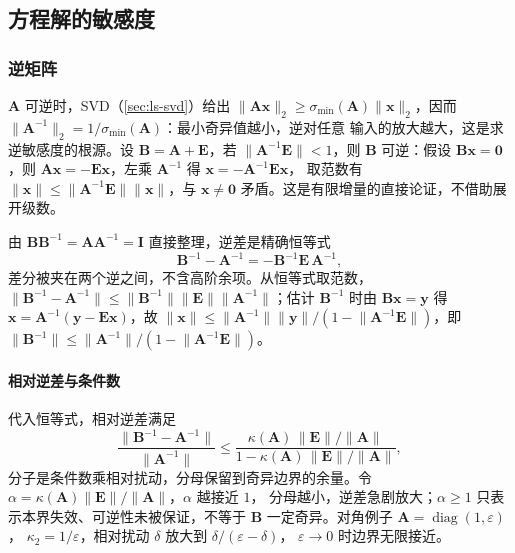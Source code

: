 \subsection{方程解的敏感度}
\label{sec:ls-equation-sensitivity}

\subsubsection{逆矩阵}
\label{sec:ls-inverse-sensitivity}
\label{sec:ch06-inverse-stability}

$\bm A$ 可逆时，SVD（\ref{sec:ls-svd}）给出 $\lVert\bm A\bm x\rVert_2
\geq\sigma_{\min}(\bm A)\lVert\bm x\rVert_2$，因而
$\lVert\bm A^{-1}\rVert_2=1/\sigma_{\min}(\bm A)$：最小奇异值越小，逆对任意
输入的放大越大，这是求逆敏感度的根源。设 $\bm B=\bm A+\bm E$，若
$\lVert\bm A^{-1}\bm E\rVert<1$，则 $\bm B$ 可逆：假设 $\bm B\bm x=\bm0$，则
$\bm A\bm x=-\bm E\bm x$，左乘 $\bm A^{-1}$ 得 $\bm x=-\bm A^{-1}\bm E\bm x$，
取范数有 $\lVert\bm x\rVert\leq\lVert\bm A^{-1}\bm E\rVert\lVert\bm x\rVert$，与
$\bm x\neq\bm0$ 矛盾。这是有限增量的直接论证，不借助展开级数。

由 $\bm B\bm B^{-1}=\bm A\bm A^{-1}=\bm I$ 直接整理，逆差是精确恒等式
\begin{equation}
 \bm B^{-1}-\bm A^{-1}
 =-\bm B^{-1}\bm E\,\bm A^{-1},
 \label{eq:ch06-inverse-finite-perturbation}
\end{equation}
差分被夹在两个逆之间，不含高阶余项。从恒等式取范数，
$\lVert\bm B^{-1}-\bm A^{-1}\rVert
\leq\lVert\bm B^{-1}\rVert\lVert\bm E\rVert\lVert\bm A^{-1}\rVert$；估计
$\bm B^{-1}$ 时由 $\bm B\bm x=\bm y$ 得 $\bm x=\bm A^{-1}(\bm y-\bm E\bm x)$，故
$\lVert\bm x\rVert\leq\lVert\bm A^{-1}\rVert\lVert\bm y\rVert/
(1-\lVert\bm A^{-1}\bm E\rVert)$，即
$\lVert\bm B^{-1}\rVert\leq\lVert\bm A^{-1}\rVert/(1-\lVert\bm A^{-1}\bm E\rVert)$。

\paragraph{相对逆差与条件数}

代入恒等式，相对逆差满足
\[
 \frac{\lVert\bm B^{-1}-\bm A^{-1}\rVert}
      {\lVert\bm A^{-1}\rVert}
 \leq
 \frac{\kappa(\bm A)\,\lVert\bm E\rVert/\lVert\bm A\rVert}
      {1-\kappa(\bm A)\,\lVert\bm E\rVert/\lVert\bm A\rVert},
\]
分子是条件数乘相对扰动，分母保留到奇异边界的余量。令
$\alpha=\kappa(\bm A)\lVert\bm E\rVert/\lVert\bm A\rVert$，$\alpha$ 越接近 $1$，
分母越小，逆差急剧放大；$\alpha\geq1$ 只表示本界失效、可逆性未被保证，不等于
$\bm B$ 一定奇异。对角例子 $\bm A=\operatorname{diag}(1,\varepsilon)$，
$\kappa_2=1/\varepsilon$，相对扰动 $\delta$ 放大到 $\delta/(\varepsilon-\delta)$，
$\varepsilon\to0$ 时边界无限接近。

